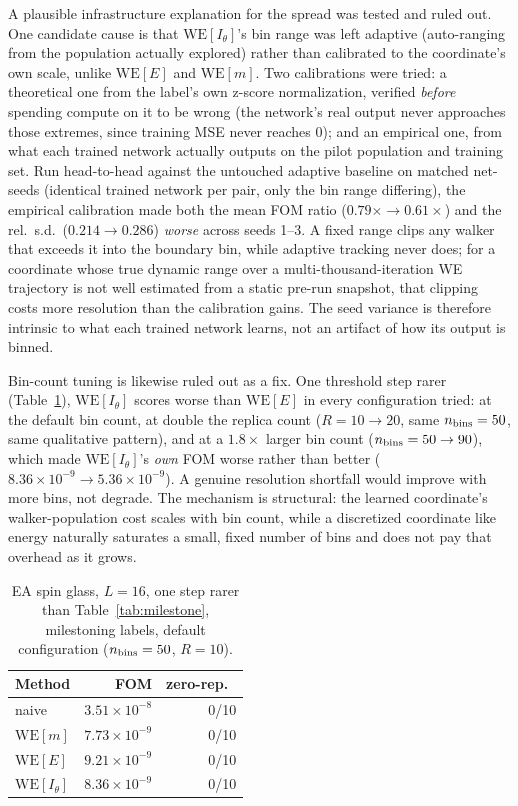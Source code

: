 \documentclass[a4paper,fleqn]{cas-sc}
\begin{document}
	A plausible infrastructure explanation for the spread was tested and ruled out. One
	candidate cause is that $\mathrm{WE}[I_\theta]$'s bin range was left adaptive (auto-ranging
	from the population actually explored) rather than calibrated to the coordinate's own
	scale, unlike $\mathrm{WE}[E]$ and $\mathrm{WE}[m]$. Two calibrations were tried: a
	theoretical one from the label's own z-score normalization, verified \emph{before} spending
	compute on it to be wrong (the network's real output never approaches those extremes, since
	training MSE never reaches 0); and an empirical one, from what each trained network actually
	outputs on the pilot population and training set. Run head-to-head against the untouched
	adaptive baseline on matched net-seeds (identical trained network per pair, only the bin
	range differing), the empirical calibration made both the mean FOM ratio
	($0.79\times\to0.61\times$) and the rel.\ s.d.\ ($0.214\to0.286$) \emph{worse} across seeds
	1--3. A fixed range clips any walker that exceeds it into the boundary bin, while adaptive
	tracking never does; for a coordinate whose true dynamic range over a multi-thousand-iteration
	WE trajectory is not well estimated from a static pre-run snapshot, that clipping costs more
	resolution than the calibration gains. The seed variance is therefore intrinsic to what each
	trained network learns, not an artifact of how its output is binned.
	
	Bin-count tuning is likewise ruled out as a fix. One threshold step rarer
	(Table~\ref{tab:milestone2}), $\mathrm{WE}[I_\theta]$ scores worse than $\mathrm{WE}[E]$ in
	every configuration tried: at the default bin count, at double the replica count
	($R=10\to20$, same $n_{\rm bins}=50$, same qualitative pattern), and at a $1.8\times$ larger
	bin count ($n_{\rm bins}=50\to90$), which made $\mathrm{WE}[I_\theta]$'s \emph{own} FOM
	worse rather than better ($8.36\times10^{-9}\to5.36\times10^{-9}$). A genuine resolution
	shortfall would improve with more bins, not degrade. The mechanism is structural: the
	learned coordinate's walker-population cost scales with bin count, while a discretized
	coordinate like energy naturally saturates a small, fixed number of bins and does not pay
	that overhead as it grows.
	
	\begin{table}[H]
		\centering\small
		\caption{EA spin glass, $L=16$, one step rarer than Table~\ref{tab:milestone}, milestoning
			labels, default configuration ($n_{\rm bins}=50$, $R=10$).}
		\label{tab:milestone2}
		\begin{tabular}{lrr}
			\toprule
			Method & FOM & zero-rep.\ \\
			\midrule
			naive & $3.51\times10^{-8}$ & 0/10 \\
			$\mathrm{WE}[m]$ & $7.73\times10^{-9}$ & 0/10 \\
			$\mathrm{WE}[E]$ & $9.21\times10^{-9}$ & 0/10 \\
			$\mathrm{WE}[I_\theta]$ & $8.36\times10^{-9}$ & 0/10 \\
			\bottomrule
		\end{tabular}
	\end{table}
	
\end{document}
